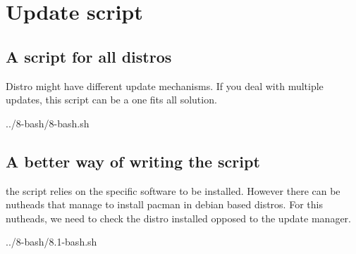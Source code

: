 \chapter{Update script}

\section{A script for all distros}

Distro might have different update mechanisms. If you deal with multiple updates, this script can
be a one fits all solution.


{../8-bash/8-bash.sh}

\section{A better way of writing the script}

the script relies on the specific software to be installed. However there can be nutheads that manage
to install pacman in debian based distros. For this nutheads, we need to check the distro installed
opposed to the update manager.


{../8-bash/8.1-bash.sh}
